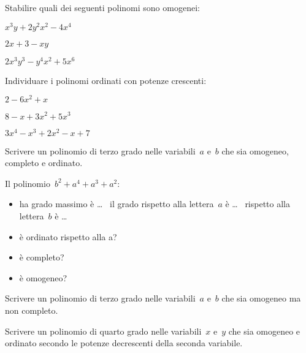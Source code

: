 \begin{htmulticols}{2}
\begin{esercizio}
\label{ese:10.3}
Stabilire quali dei seguenti polinomi sono omogenei:

\begin{enumeratea}
\item \(x^3y+2y^2x^2-4x^4\)
\item \(2x+3-xy\)
\item \(2x^3y^3-y^4x^2+5x^6\)
\end{enumeratea}
\end{esercizio}

\begin{esercizio}
\label{ese:10.4}
Individuare i polinomi ordinati con potenze crescenti:

\begin{enumeratea}
\item \(2-6x^2+x\)
\item \(8-x+3x^2+5x^3\)
\item \(3x^4-x^3+2x^2-x+7\)
\end{enumeratea}
\end{esercizio}

\begin{esercizio}
\label{ese:10.6}
Scrivere un polinomio di terzo grado nelle variabili~\(a\) e~\(b\) che sia 
omogeneo, completo e ordinato.
\end{esercizio}

\begin{esercizio}
\label{ese:10.5}
Il polinomio~\(b^2+a^4+a^3+a^2\):
\begin{itemize} [nosep]
\item ha grado massimo è \ldots~ il grado rispetto alla lettera~\(a\) è 
\ldots ~
rispetto alla lettera~\(b\) è \ldots
\item è ordinato rispetto alla a? \hfill\verofalso
\item è completo? \hfill\verofalso
\item è omogeneo? \hfill\verofalso
\end{itemize}
\end{esercizio}

\begin{esercizio}
\label{ese:10.7}
Scrivere un polinomio di terzo grado nelle variabili~\(a\) e~\(b\) che sia 
omogeneo ma non completo.
\end{esercizio}

\begin{esercizio}
\label{ese:10.7}
Scrivere un polinomio di quarto grado nelle variabili~\(x\) e~\(y\) che sia 
omogeneo e ordinato secondo le potenze decrescenti della seconda variabile.
\end{esercizio}


\end{htmulticols}
